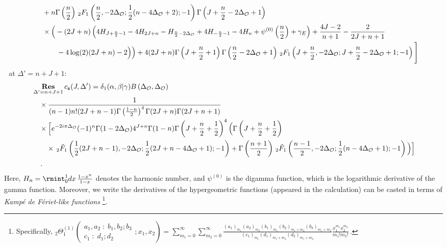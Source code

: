 \begin{align}
&\qquad +n \Gamma \left(\frac{n}{2}\right) \, _2F_1\left(\frac{n}{2},-2 \Delta_{\mathcal{O}};\frac{1}{2} (n-4 \Delta_{\mathcal{O}}+2);-1\right) \Gamma \left(J+\frac{n}{2}-2 \Delta_{\mathcal{O}}+1\right)\notag\\
&\qquad \times\Big(-(2 J+n) \left(4 H_{J+\frac{n}{2}-1}-4 H_{2 J+n}-H_{\frac{n}{2}-2 \Delta_{\mathcal{O}}}+4 H_{-\frac{n}{2}-1}-4 H_n+\psi ^{(0)}\left(\frac{n}{2}\right)+\gamma_E \right)+\frac{4 J-2}{n+1}-\frac{2}{2 J+n+1}\notag\\
&\qquad\qquad -4 \log (2) (2 J+n)-2\Big)\Big)+4 (2 J+n) \Gamma \left(J+\frac{n}{2}+1\right) \Gamma \left(\frac{n}{2}-2 \Delta_{\mathcal{O}}+1\right) \, _2F_1\left(J+\frac{n}{2},-2 \Delta_{\mathcal{O}};J+\frac{n}{2}-2 \Delta_{\mathcal{O}}+1;-1\right)\Bigg]\label{4.62i}
\end{align}
\endgroup
\textbullet $\,\,$ at $\Delta' = n+J+1:$
\begingroup\small
\begin{align}
&\mathop{\mathbf{Res}}_{\Delta' = n+J+1}c_{\texttt{s}}(J,\Delta')
=\delta_1(\alpha,\beta|\gamma) B\left(\Delta_{\mathcal{O}},\Delta_{\mathcal{O}}\right)\notag\\
&\quad\times\frac{1}{(n-1) n! (2 J+n-1) \Gamma \left(\frac{1-n}{2}\right)^4 \Gamma (2 J+n) \Gamma (2 J+n+1)}\notag\\
&\quad\times \Big[e^{-2 i \pi  \Delta_{\mathcal{O}}} (-1)^n \Gamma (1-2 \Delta_{\mathcal{O}}) 4^{J+n} \Gamma (1-n) \Gamma \left(J+\frac{n}{2}+\frac{1}{2}\right)^4 \Big(\Gamma \left(J+\frac{n}{2}+\frac{1}{2}\right)\notag\\
&\qquad\times\, _2\tilde{F}_1\left(\frac{1}{2} (2 J+n-1),-2 \Delta_{\mathcal{O}};\frac{1}{2} (2 J+n-4 \Delta_{\mathcal{O}}+1);-1\right)+\Gamma \left(\frac{n+1}{2}\right) \, _2\tilde{F}_1\left(\frac{n-1}{2},-2 \Delta_{\mathcal{O}};\frac{1}{2} (n-4 \Delta_{\mathcal{O}}+1);-1\right)\Big)\Big]\notag\\
&\quad \,.\label{4.63e1}
\end{align}
\endgroup
Here,  \(H_n = \rmint_{0}^1 dx\,\frac{1 - x^n}{1 - x}\) denotes the harmonic number, and \(\psi^{(0)}\) is the digamma function, which is the logarithmic derivative of the gamma function. Moreover, we write the  derivatives of the hypergeometric functions (appeared in the calculation) can be casted in terms of \textit{Kampé de Fériet-like functions} \cite{Ancarani:2009zz}\footnote{Specifically, $
   {_2}\Theta_1^{(1)} \left( 
\begin{matrix}
a_1, a_2 \; : \; b_1, b_2; b_3 \\
c_1 \; : \; d_1; d_2
\end{matrix}
; x_1, x_2 \right)
= 
\sum_{m_1=0}^{\infty} \sum_{m_2=0}^{\infty} 
\frac{
(a_1)_{m_1} (a_2)_{m_2} (b_1)_{m_1} (b_2)_{m_1 + m_2} (b_3)_{m_1 + m_2}
}{
(c_1)_{m_1} (d_1)_{m_1 + m_2} (d_2)_{m_1 + m_2}
}
\frac{x_1^{m_1} x_2^{m_2}}{m_1! m_2!}\,.\nonumber
$}.
